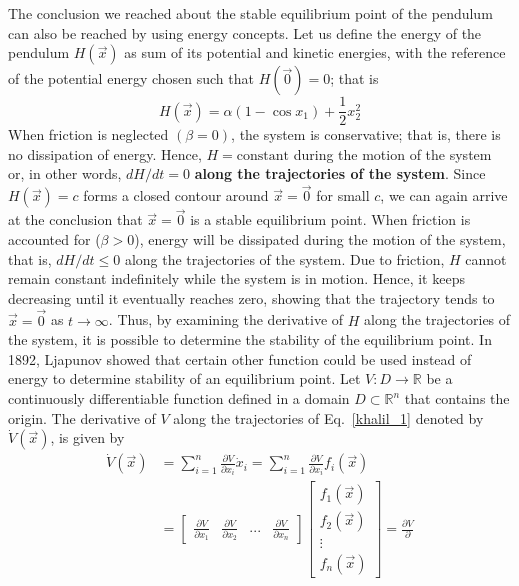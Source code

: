 \documentclass[12pt,a4paper,oneside]{book}
\begin{document}
\begin{onehalfspace}
The conclusion we reached about the stable equilibrium point of the pendulum 
can also be reached by using energy concepts. Let us define the energy of the 
pendulum $H(\vec{x})$ as sum of its potential and kinetic energies, with the 
reference of the potential energy chosen such that $H(\vec{0})=0$; that is 
\begin{equation*}
	H(\vec{x}) = \alpha(1-\cos x_1) + \frac{1}{2}x_2^2 
\end{equation*}
When friction is neglected $(\beta=0)$, the system is conservative; that is, 
there is no dissipation of energy. Hence, $H = \text{constant}$ during the 
motion of the system or, in other words, ${dH}/{dt}=0$ \textbf{along the 
trajectories of the system}. Since $H(\vec{x})=c$ forms a closed contour around 
$\vec{x}=\vec{0}$ for small $c$, we can again arrive at the conclusion that 
$\vec{x}=\vec{0}$ is a stable equilibrium point. When friction is accounted for 
($\beta>0$), energy will be dissipated during the motion of the system, that 
is, ${dH}/{dt}\le0$ along the trajectories of the system. Due to friction, $H$ 
cannot remain constant indefinitely while the system is in motion. Hence, it 
keeps decreasing until it eventually reaches zero, showing that the trajectory 
tends to $\vec{x}=\vec{0}$ as $t\rightarrow\infty$. Thus, by examining the 
derivative of $H$ along the trajectories of the system, it is possible to 
determine the stability of the equilibrium point. In 1892, Ljapunov showed that 
certain other function could be used instead of energy to determine stability 
of an equilibrium point. Let $V:D\rightarrow\mathbb{R}$ be a continuously 
differentiable function defined in a domain $D\subset\mathbb{R}^n$ that 
contains the origin. The derivative of $V$ along the trajectories of 
Eq.~\eqref{khalil_1} denoted by $\dot{V}(\vec{x})$, is given by
\begin{equation}
	\begin{aligned}
		\dot{V}(\vec{x})&=\sum_{i=1}^{n}\frac{\partial V}{\partial 
		x_i}\dot{x}_i = \sum_{i=1}^{n}\frac{\partial V}{\partial 
		x_i}f_i(\vec{x}) \\[6pt]
		&= \begin{bmatrix} \frac{\partial V}{\partial x_1} & \frac{\partial 
		V}{\partial x_2} & ... & \frac{\partial V}{\partial x_n} \end{bmatrix} 
		\begin{bmatrix} f_1(\vec{x}) \\[6pt] f_2(\vec{x}) \\[6pt] \vdots 
		\\[6pt] f_n(\vec{x}) \end{bmatrix} = \frac{\partial V}{\partial 
}
\end{aligned}
\end{equation}
\end{onehalfspace}
\end{document}
